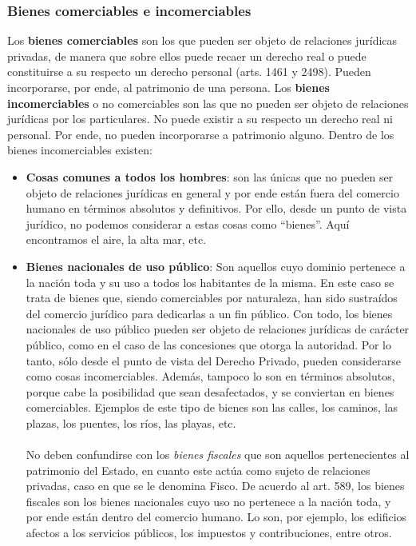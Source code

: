 \documentclass{templateNote}
\begin{document}
\subsubsection*{Bienes comerciables e incomerciables}

Los \textbf{bienes comerciables} son los  que pueden ser objeto de relaciones jurídicas privadas, de manera que sobre ellos puede recaer un derecho real o puede constituirse a su respecto un derecho personal (arts. 1461 y 2498). Pueden incorporarse, por ende, al patrimonio de una persona. 
Los \textbf{bienes incomerciables} o no comerciables son las que no pueden ser objeto de relaciones jurídicas por los particulares. No puede existir a su respecto un derecho real ni personal. Por ende, no pueden incorporarse a patrimonio alguno.
Dentro de los bienes incomerciables existen: 
\begin{itemize}
    \item \textbf{Cosas comunes a todos los hombres}: son las únicas que no pueden ser objeto de relaciones jurídicas en general y por ende están fuera del comercio humano en términos absolutos y definitivos. Por ello, desde un punto de vista jurídico, no podemos considerar a estas cosas como “bienes”. Aquí encontramos el aire, la alta mar, etc.
    \item \textbf{Bienes nacionales de uso público}:  Son aquellos cuyo dominio pertenece a la nación toda y su uso a todos los habitantes de la misma. En este caso se trata de bienes que, siendo comerciables por naturaleza, han sido sustraídos del comercio jurídico para dedicarlas a un fin público. Con todo, los bienes nacionales de uso público pueden ser objeto de relaciones jurídicas de carácter público, como en el caso de las concesiones que otorga la autoridad. Por lo tanto, sólo desde el punto de vista del Derecho Privado, pueden considerarse como cosas incomerciables. Además, tampoco lo son en términos absolutos, porque cabe la posibilidad que sean desafectados, y se conviertan en bienes comerciables. Ejemplos de este tipo de bienes son las calles, los caminos, las plazas, los puentes, los ríos, las playas, etc. \\\\No deben confundirse con los \textit{bienes fiscales} que son aquellos pertenecientes al patrimonio del Estado, en cuanto este actúa como sujeto de relaciones privadas, caso en que se le denomina Fisco. De acuerdo al art. 589, los bienes fiscales son los bienes nacionales cuyo uso no pertenece a la nación toda, y por ende están dentro del comercio humano. Lo son, por ejemplo, los edificios afectos a los servicios públicos, los impuestos y contribuciones, entre otros.
\end{itemize}
\end{document}

